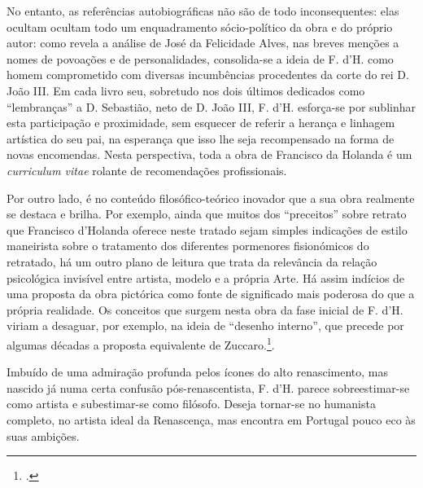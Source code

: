 \documentclass{article}
\begin{document}
No entanto, as referências autobiográficas não são de todo
inconsequentes: elas ocultam ocultam todo um enquadramento
sócio-político da obra e do próprio autor: como revela a análise de
José da Felicidade Alves, nas breves menções a nomes de povoações e de
personalidades, consolida-se a ideia de F. d'H. como homem
comprometido com diversas incumbências procedentes da corte do rei
D. João III. Em cada livro seu, sobretudo nos dois últimos dedicados
como ``lembranças'' a D. Sebastião, neto de D. João III,
F. d'H. esforça-se por sublinhar esta participação e proximidade, sem
esquecer de referir a herança e linhagem artística do seu pai, na
esperança que isso lhe seja recompensado na forma de novas
encomendas. Nesta perspectiva, toda a obra de Francisco da Holanda é
um \emph{curriculum vitae} rolante de recomendações profissionais.

Por outro lado, é no conteúdo filosófico-teórico inovador que a sua
obra realmente se destaca e brilha. Por exemplo, ainda que muitos dos
``preceitos'' sobre retrato que Francisco d'Holanda oferece neste
tratado sejam simples indicações de estilo maneirista sobre o
tratamento dos diferentes pormenores fisionómicos do retratado, há um
outro plano de leitura que trata da relevância da relação psicológica
invisível entre artista, modelo e a própria Arte. Há assim indícios de
uma proposta da obra pictórica como fonte de significado mais poderosa
do que a própria realidade. Os conceitos que surgem nesta obra da fase
inicial de F. d'H. viriam a desaguar, por exemplo, na ideia de
``desenho interno'', que precede por algumas décadas a proposta
equivalente de Zuccaro.\footcite{holanda-desenho}.

Imbuído de uma admiração profunda pelos ícones do alto renascimento,
mas nascido já numa certa confusão pós-renascentista, F. d'H. parece
sobreestimar-se como artista e subestimar-se como filósofo. Deseja
tornar-se no humanista completo, no artista ideal da Renascença, mas
encontra em Portugal pouco eco às suas ambições.

\printbibliography[heading=bibliography,title={Bibliografia}]
\end{document}
